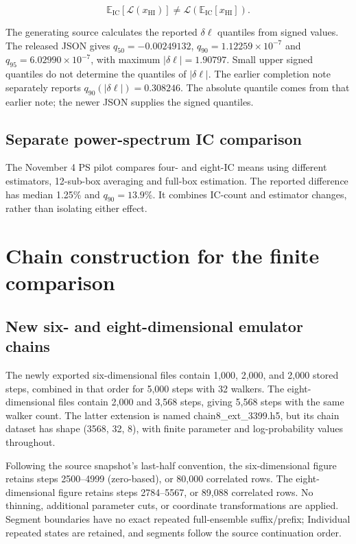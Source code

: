 \[
\mathbb{E}_{\mathrm{IC}}[\mathcal{L}(x_{\mathrm{HI}})]
\ne \mathcal{L}(\mathbb{E}_{\mathrm{IC}}[x_{\mathrm{HI}}]).
\]

The generating source calculates the reported $\delta\ell$ quantiles from signed values. The released JSON gives $q_{50}=-0.00249132$, $q_{90}=1.12259\times10^{-7}$ and $q_{95}=6.02990\times10^{-7}$, with maximum $|\delta\ell|=1.90797$. Small upper signed quantiles do not determine the quantiles of $|\delta\ell|$. The earlier completion note separately reports $q_{90}(|\delta\ell|)=0.308246$. The absolute quantile comes from that earlier note; the newer JSON supplies the signed quantiles.



\subsection{Separate power-spectrum IC comparison}

The November 4 PS pilot compares four- and eight-IC means using different estimators, 12-sub-box averaging and full-box estimation. The reported difference has median 1.25\% and $q_{90}=13.9\%$. It combines IC-count and estimator changes, rather than isolating either effect.

\section{Chain construction for the finite comparison}\label{app:current-chains}

\subsection{New six- and eight-dimensional emulator chains}\label{new-six--and-eight-dimensional-emulator-chains}

The newly exported six-dimensional files contain 1,000, 2,000, and 2,000 stored steps, combined in that order for 5,000 steps with 32 walkers. The eight-dimensional files contain 2,000 and 3,568 steps, giving 5,568 steps with the same walker count. The latter extension is named chain8\_ext\_3399.h5, but its chain dataset has shape (3568, 32, 8), with finite parameter and log-probability values throughout.

Following the source snapshot's last-half convention, the six-dimensional figure retains steps 2500--4999 (zero-based), or 80,000 correlated rows. The eight-dimensional figure retains steps 2784--5567, or 89,088 correlated rows. No thinning, additional parameter cuts, or coordinate transformations are applied. Segment boundaries have no exact repeated full-ensemble suffix/prefix; Individual repeated states are retained, and segments follow the source continuation order.


